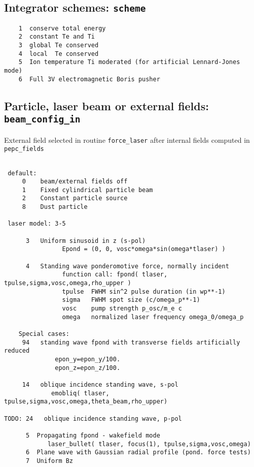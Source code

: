 \documentclass[11pt,psfig]{article}
\begin{document}
\subsection{Integrator schemes:  {\tt scheme}}
\begin{verbatim}
    1  conserve total energy
    2  constant Te and Ti 
    3  global Te conserved
    4  local  Te conserved
    5  Ion temperature Ti moderated (for artificial Lennard-Jones mode) 
    6  Full 3V electromagnetic Boris pusher  
\end{verbatim}

\subsection{Particle, laser beam or external fields:   {\tt beam\_config\_in}}
  External field selected in routine {\tt force\_laser}
  after internal fields computed in {\tt pepc\_fields}

\begin{verbatim}

 default:  
     0    beam/external fields off
     1    Fixed cylindrical particle beam
     2    Constant particle source
     8    Dust particle

 laser model: 3-5

      3   Uniform sinusoid in z (s-pol)
                Epond = (0, 0, vosc*omega*sin(omega*tlaser) )

      4   Standing wave ponderomotive force, normally incident
                function call: fpond( tlaser, tpulse,sigma,vosc,omega,rho_upper )
                tpulse  FWHM sin^2 pulse duration (in wp**-1)
                sigma   FWHM spot size (c/omega_p**-1)
                vosc    pump strength p_osc/m_e c
                omega   normalized laser frequency omega_0/omega_p
 
    Special cases:
     94   standing wave fpond with transverse fields artificially reduced
              epon_y=epon_y/100.
              epon_z=epon_z/100.

     14   oblique incidence standing wave, s-pol
             emobliq( tlaser, tpulse,sigma,vosc,omega,theta_beam,rho_upper)

TODO: 24   oblique incidence standing wave, p-pol

      5  Propagating fpond - wakefield mode
            laser_bullet( tlaser, focus(1), tpulse,sigma,vosc,omega)
      6  Plane wave with Gaussian radial profile (pond. force tests)
      7  Uniform Bz

\end{verbatim}
\end{document}
